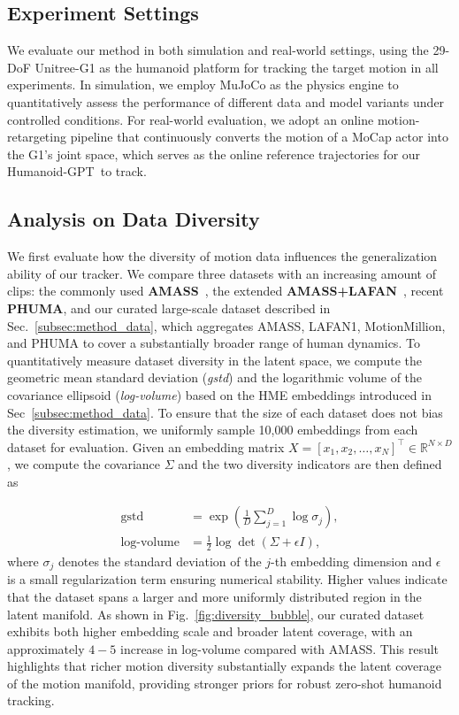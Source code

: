 \documentclass{llmxive}
\providecommand{\methodname}{Humanoid-GPT\xspace}
\begin{document}
\subsection{Experiment Settings}

We evaluate our method in both simulation and real-world settings, 
using the 29-DoF Unitree-G1 as the humanoid platform for tracking the target motion in all experiments. In simulation, we employ MuJoCo\citep{mujoco12} as the physics engine to quantitatively assess the performance of different data and model variants under controlled conditions. For real-world evaluation, we adopt an online motion-retargeting pipeline that continuously converts the motion of a MoCap actor into the G1’s joint space, which serves as the online reference trajectories for our \methodname\ to track. 

\subsection{Analysis on Data Diversity}
We first evaluate how the diversity of motion data influences the generalization ability of our tracker. We compare three datasets with an increasing amount of clips: the commonly used \textbf{AMASS}~\citep{amass19}, the extended \textbf{AMASS+LAFAN}~\citep{lafan20}, recent \textbf{PHUMA}\citep{phuma25}, and our curated large-scale dataset described in Sec.~\ref{subsec:method_data}, which aggregates AMASS, LAFAN1, MotionMillion, and PHUMA to cover a substantially broader range of human dynamics. To quantitatively measure dataset diversity in the latent space, we compute the geometric mean standard deviation (\textit{gstd}) and the logarithmic volume of the covariance ellipsoid (\textit{log-volume}) based on the HME embeddings introduced in Sec~\ref{subsec:method_data}. To ensure that the size of each dataset does not bias the diversity estimation, we uniformly sample 10{,}000 embeddings from each dataset for evaluation. Given an embedding matrix $X = [x_1, x_2, \dots, x_N]^\top \in \mathbb{R}^{N \times D}$, we compute the covariance $\Sigma$ and the two diversity indicators are then defined as

\begin{equation}
\begin{aligned}
    \text{gstd} &= \exp\!\left( \frac{1}{D} \sum_{j=1}^{D} \log \sigma_j \right), \\
    \text{log-volume} &= \tfrac{1}{2}\log\det(\Sigma + \epsilon I),
\end{aligned}
\end{equation}
where $\sigma_j$ denotes the standard deviation of the $j$-th embedding dimension and $\epsilon$ is a small regularization term ensuring numerical stability. Higher values indicate that the dataset spans a larger and more uniformly distributed region in the latent manifold. As shown in Fig.~\ref{fig:diversity_bubble}, our curated dataset exhibits both higher embedding scale and broader latent coverage, with an approximately $4\!-\!5$ increase in log-volume compared with AMASS. This result highlights that richer motion diversity substantially expands the latent coverage of the motion manifold, providing stronger priors for robust zero-shot humanoid tracking.
\end{document}
